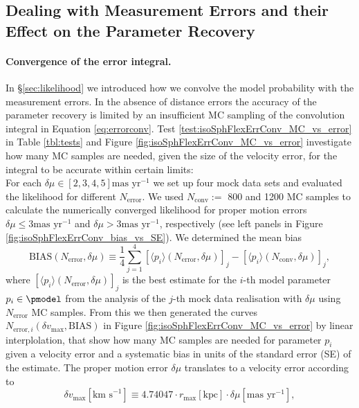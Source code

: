 \subsection{Dealing with Measurement Errors and their Effect on the Parameter Recovery} \label{sec:results_errors}

\paragraph{Convergence of the error integral.} In \S \ref{sec:likelihood} we introduced how we convolve the model probability with the measurement errors. In the absence of distance errors the accuracy of the parameter recovery is limited by an insufficient MC sampling of the convolution integral in Equation \ref{eq:errorconv}. Test \ref{test:isoSphFlexErrConv_MC_vs_error} in Table \ref{tbl:tests} and Figure \ref{fig:isoSphFlexErrConv_MC_vs_error} investigate how many MC samples are needed, given the size of the velocity error, for the integral to be accurate within certain limits:
\\For each $\delta \mu \in [2,3,4,5] \text{mas yr}^{-1}$ we set up four mock data sets and evaluated the likelihood for different $N_\text{error}$. We used $N_\text{conv} :=$ 800 and 1200 MC samples to calculate the numerically converged likelihood for proper motion errors $\delta \mu \leq 3 \text{mas yr}^{-1}$ and $\delta \mu > 3 \text{mas yr}^{-1}$, respectively (see left panels in Figure \ref{fig:isoSphFlexErrConv_bias_vs_SE}). We determined the mean bias 
\begin{equation*}
\text{BIAS}(N_\text{error},\delta \mu) \equiv \frac{1}{4} \sum_{j=1}^4 \left[ \langle p_i \rangle (N_\text{error},\delta \mu)\right]_j - \left[ \langle p_i \rangle (N_\text{conv},\delta \mu)\right]_j,
\end{equation*}
where $\left[ \langle p_i \rangle (N_\text{error},\delta \mu)\right]_j$ is the best estimate for the $i$-th model parameter $p_i \in \pmodel$ from the analysis of the $j$-th mock data realisation with $\delta \mu$ using $N_\text{error}$ MC samples. From this we then generated the curves $N_{\text{error},i} (\delta v_\text{max},\text{BIAS})$ in Figure \ref{fig:isoSphFlexErrConv_MC_vs_error} by linear interplolation, that show how many MC samples are needed for parameter $p_i$ given a velocity error and a systematic bias in units of the standard error (SE) of the estimate. The proper motion error $\delta \mu$ translates to a velocity error according to 
\begin{equation}
\delta v_\text{max} [\text{km s}^{-1}] \equiv 4.74047 \cdot r_\text{max}[\text{kpc}] \cdot \delta \mu [\text{mas yr}^{-1}], \label{eq:vmax}
\end{equation}
